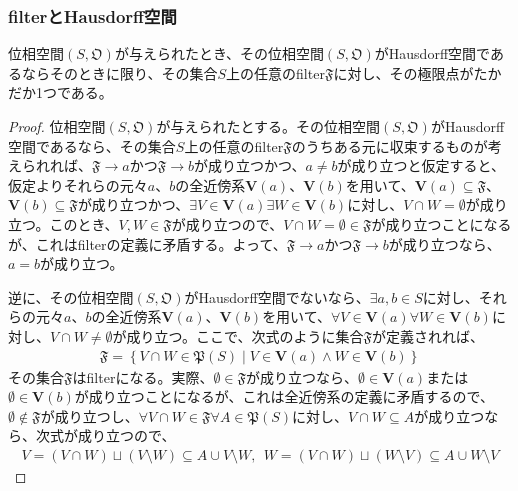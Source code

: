 \documentclass[dvipdfmx]{jsarticle}
\begin{document}
\subsubsection{filterとHausdorff空間}
\begin{thm}\label{8.1.8.18}
位相空間$\left( S,\mathfrak{O} \right)$が与えられたとき、その位相空間$\left( S,\mathfrak{O} \right)$がHausdorff空間であるならそのときに限り、その集合$S$上の任意のfilter$\mathfrak{F}$に対し、その極限点がたかだか1つである。
\end{thm}
\begin{proof}
位相空間$\left( S,\mathfrak{O} \right)$が与えられたとする。その位相空間$\left( S,\mathfrak{O} \right)$がHausdorff空間であるなら、その集合$S$上の任意のfilter$\mathfrak{F}$のうちある元に収束するものが考えられれば、$\mathfrak{F} \rightarrow a$かつ$\mathfrak{F} \rightarrow b$が成り立つかつ、$a \neq b$が成り立つと仮定すると、仮定よりそれらの元々$a$、$b$の全近傍系$\mathbf{V}(a)$、$\mathbf{V}(b)$を用いて、$\mathbf{V}(a)\subseteq \mathfrak{F}$、$\mathbf{V}(b)\subseteq \mathfrak{F}$が成り立つかつ、$\exists V \in \mathbf{V}(a)\exists W \in \mathbf{V}(b)$に対し、$V \cap W = \emptyset$が成り立つ。このとき、$V,W \in \mathfrak{F}$が成り立つので、$V \cap W = \emptyset \in \mathfrak{F}$が成り立つことになるが、これはfilterの定義に矛盾する。よって、$\mathfrak{F} \rightarrow a$かつ$\mathfrak{F} \rightarrow b$が成り立つなら、$a = b$が成り立つ。\par
逆に、その位相空間$\left( S,\mathfrak{O} \right)$がHausdorff空間でないなら、$\exists a,b \in S$に対し、それらの元々$a$、$b$の全近傍系$\mathbf{V}(a)$、$\mathbf{V}(b)$を用いて、$\forall V \in \mathbf{V}(a)\forall W \in \mathbf{V}(b)$に対し、$V \cap W \neq \emptyset$が成り立つ。ここで、次式のように集合$\mathfrak{F}$が定義されれば、
\begin{align*}
\mathfrak{F} = \left\{ V \cap W \in \mathfrak{P}(S) \middle| V \in \mathbf{V}(a) \land W \in \mathbf{V}(b) \right\}
\end{align*}
その集合$\mathfrak{F}$はfilterになる。実際、$\emptyset \in \mathfrak{F}$が成り立つなら、$\emptyset \in \mathbf{V}(a)$または$\emptyset \in \mathbf{V}(b)$が成り立つことになるが、これは全近傍系の定義に矛盾するので、$\emptyset \notin \mathfrak{F}$が成り立つし、$\forall V \cap W \in \mathfrak{F}\forall A \in \mathfrak{P}(S)$に対し、$V \cap W \subseteq A$が成り立つなら、次式が成り立つので、
\begin{align*}
V = (V \cap W) \sqcup (V \setminus W) \subseteq A \cup V \setminus W,\ \ W = (V \cap W) \sqcup (W \setminus V) \subseteq A \cup W \setminus V

\end{align*}
\end{proof}
\end{document}
